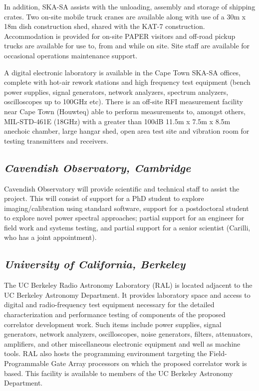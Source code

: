 \documentclass[11pt]{article}
\begin{document}
In addition, SKA-SA assists with the unloading, assembly and storage of
shipping crates. Two on-site mobile truck cranes are available along with use
of a 30m x 18m dish construction shed, shared with the KAT-7 construction.
Accommodation is provided for on-site PAPER visitors and off-road pickup trucks
are available for use to, from and while on site.  Site staff are available for
occasional operations maintenance support.

A digital electronic laboratory is available in the Cape Town SKA-SA offices,
complete with hot-air rework stations and high frequency test equipment (bench
power supplies, signal generators, network analyzers, spectrum analyzers,
oscilloscopes up to 100GHz etc). There is an off-site RFI measurement facility
near Cape Town (Houwteq) able to perform measurements to, amongst others,
MIL-STD-461E (18GHz) with a greater than 100dB 11.5m x 7.5m x 8.5m anechoic
chamber, large hangar shed, open area test site and vibration room for testing
transmitters and receivers.

\subsection*{\it Cavendish Observatory, Cambridge}

Cavendish Observatory will provide scientific and technical staff to assist the project.  This will consist of
support for a PhD student to explore imaging/calibration using standard software,
support for a postdoctoral student 
to explore novel power spectral approaches; 
partial support for an engineer for field work and systems testing,
and partial support for a senior scientist (Carilli, who has a joint appointment).

\subsection*{\it University of California, Berkeley}

The UC Berkeley Radio Astronomy Laboratory (RAL) is located adjacent to the UC
Berkeley Astronomy Department. It provides laboratory space and access to
digital and radio-frequency test equipment necessary for the detailed
characterization and performance testing of components of the proposed correlator
development work. Such items include power supplies, signal generators, network
analyzers, oscilloscopes, noise generators, filters, attenuators, amplifiers,
and other miscellaneous electronic equipment and well as machine tools. RAL also hosts the programming
environment targeting the Field-Programmable Gate Array processors on which the
proposed correlator work is based. This facility is available to members of the
UC Berkeley Astronomy Department.
\end{document}
